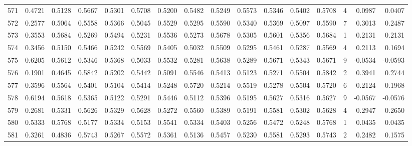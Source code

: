 \begin{tabular}{lrrrrrrrrrrrrrrr}
571 &      0.4721 &  0.5128 &  0.5667 &  0.5301 &  0.5708 &  0.5200 &  0.5482 &  0.5249 &  0.5573 &  0.5346 &   0.5402 &     0.5708 &      4 &                    0.0987 &                     0.0407 \\
572 &      0.2577 &  0.5064 &  0.5558 &  0.5366 &  0.5045 &  0.5529 &  0.5295 &  0.5590 &  0.5340 &  0.5369 &   0.5097 &     0.5590 &      7 &                    0.3013 &                     0.2487 \\
573 &      0.3553 &  0.5684 &  0.5269 &  0.5494 &  0.5231 &  0.5536 &  0.5273 &  0.5678 &  0.5305 &  0.5601 &   0.5356 &     0.5684 &      1 &                    0.2131 &                     0.2131 \\
574 &      0.3456 &  0.5150 &  0.5466 &  0.5242 &  0.5569 &  0.5405 &  0.5032 &  0.5509 &  0.5295 &  0.5461 &   0.5287 &     0.5569 &      4 &                    0.2113 &                     0.1694 \\
575 &      0.6205 &  0.5612 &  0.5346 &  0.5368 &  0.5033 &  0.5532 &  0.5281 &  0.5638 &  0.5289 &  0.5671 &   0.5343 &     0.5671 &      9 &                   -0.0534 &                    -0.0593 \\
576 &      0.1901 &  0.4645 &  0.5842 &  0.5202 &  0.5442 &  0.5091 &  0.5546 &  0.5413 &  0.5123 &  0.5271 &   0.5504 &     0.5842 &      2 &                    0.3941 &                     0.2744 \\
577 &      0.3596 &  0.5564 &  0.5401 &  0.5104 &  0.5414 &  0.5248 &  0.5720 &  0.5214 &  0.5519 &  0.5278 &   0.5504 &     0.5720 &      6 &                    0.2124 &                     0.1968 \\
578 &      0.6194 &  0.5618 &  0.5365 &  0.5122 &  0.5291 &  0.5446 &  0.5112 &  0.5396 &  0.5195 &  0.5627 &   0.5316 &     0.5627 &      9 &                   -0.0567 &                    -0.0576 \\
579 &      0.2681 &  0.5331 &  0.5626 &  0.5329 &  0.5628 &  0.5272 &  0.5560 &  0.5389 &  0.5191 &  0.5581 &   0.5302 &     0.5628 &      4 &                    0.2947 &                     0.2650 \\
580 &      0.5333 &  0.5768 &  0.5177 &  0.5334 &  0.5153 &  0.5541 &  0.5334 &  0.5403 &  0.5256 &  0.5472 &   0.5248 &     0.5768 &      1 &                    0.0435 &                     0.0435 \\
581 &      0.3261 &  0.4836 &  0.5743 &  0.5267 &  0.5572 &  0.5361 &  0.5136 &  0.5457 &  0.5230 &  0.5581 &   0.5293 &     0.5743 &      2 &                    0.2482 &                     0.1575 \\

\end{tabular}
